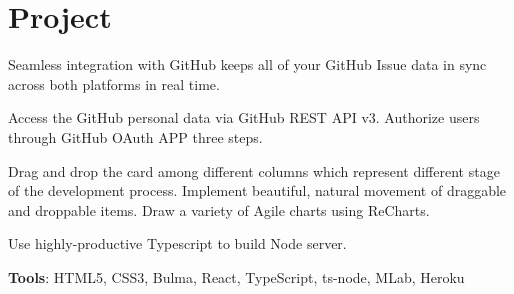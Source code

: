 \documentclass[letterpaper]{deedy-resume} %
\begin{document}
\begin{minipage}[t]{0.66\textwidth}
\begin{tightitemize}
\end{tightitemize}
\sectionspace
\section{Project}

\vspace{\topsep} %
\begin{tightitemize}
	\item Seamless integration with GitHub keeps all of your GitHub Issue data in sync across both platforms in real time.
	\item Access the GitHub personal data via GitHub REST API v3. Authorize users through GitHub OAuth APP three steps.
	\item Drag and drop the card among different columns which represent different stage of the development process. Implement beautiful, natural movement of draggable and droppable items. Draw a variety of Agile charts using ReCharts.
	\item Use highly-productive Typescript to build Node server.
	\item \textbf{Tools}: HTML5, CSS3, Bulma, React, TypeScript, ts-node, MLab, Heroku
\end{tightitemize}





\sectionspace %

\vspace{\topsep} %






\end{minipage}
\end{document}
